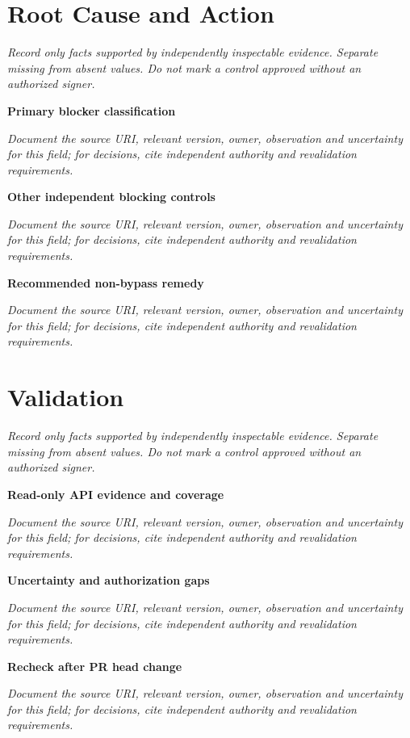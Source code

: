 \documentclass[11pt,letterpaper]{article}
\begin{document}
\section{Root Cause and Action}
\noindent\emph{Record only facts supported by independently inspectable evidence. Separate missing from absent values. Do not mark a control approved without an authorized signer.}\par
\noindent\textbf{Primary blocker classification}\par
\noindent\emph{Document the source URI, relevant version, owner, observation and uncertainty for this field; for decisions, cite independent authority and revalidation requirements.}\par\medskip
\noindent\textbf{Other independent blocking controls}\par
\noindent\emph{Document the source URI, relevant version, owner, observation and uncertainty for this field; for decisions, cite independent authority and revalidation requirements.}\par\medskip
\noindent\textbf{Recommended non-bypass remedy}\par
\noindent\emph{Document the source URI, relevant version, owner, observation and uncertainty for this field; for decisions, cite independent authority and revalidation requirements.}\par\medskip
\section{Validation}
\noindent\emph{Record only facts supported by independently inspectable evidence. Separate missing from absent values. Do not mark a control approved without an authorized signer.}\par
\noindent\textbf{Read-only API evidence and coverage}\par
\noindent\emph{Document the source URI, relevant version, owner, observation and uncertainty for this field; for decisions, cite independent authority and revalidation requirements.}\par\medskip
\noindent\textbf{Uncertainty and authorization gaps}\par
\noindent\emph{Document the source URI, relevant version, owner, observation and uncertainty for this field; for decisions, cite independent authority and revalidation requirements.}\par\medskip
\noindent\textbf{Recheck after PR head change}\par
\noindent\emph{Document the source URI, relevant version, owner, observation and uncertainty for this field; for decisions, cite independent authority and revalidation requirements.}\par\medskip
\end{document}

